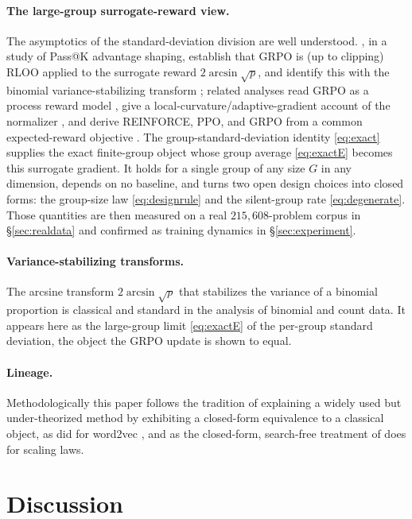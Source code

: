 \documentclass[11pt]{article}
\theoremstyle{plain}
\theoremstyle{definition}
\begin{document}
\paragraph{The large-group surrogate-reward view.} The asymptotics of the standard-deviation division are well understood. \citet{thrampoulidis2025advantageshaping}, in a study of Pass@K advantage shaping, establish that GRPO is (up to clipping) RLOO applied to the surrogate reward $2\arcsin\sqrt{p}$, and identify this with the binomial variance-stabilizing transform \citep{bartlett1936,anscombe1948}; related analyses read GRPO as a process reward model \citep{grpoprm2025}, give a local-curvature/adaptive-gradient account of the normalizer \citep{curvature2026}, and derive REINFORCE, PPO, and GRPO from a common expected-reward objective \citep{firstprinciples2026}. The group-standard-deviation identity \eqref{eq:exact} supplies the exact finite-group object whose group average \eqref{eq:exactE} becomes this surrogate gradient. It holds for a single group of any size $G$ in any dimension, depends on no baseline, and turns two open design choices into closed forms: the group-size law \eqref{eq:designrule} and the silent-group rate \eqref{eq:degenerate}. Those quantities are then measured on a real $215{,}608$-problem corpus in \S\ref{sec:realdata} and confirmed as training dynamics in \S\ref{sec:experiment}.

\paragraph{Variance-stabilizing transforms.} The arcsine transform $2\arcsin\sqrt p$ that stabilizes the variance of a binomial proportion is classical \citep{bartlett1936,anscombe1948} and standard in the analysis of binomial and count data. It appears here as the large-group limit \eqref{eq:exactE} of the per-group standard deviation, the object the GRPO update is shown to equal.

\paragraph{Lineage.} Methodologically this paper follows the tradition of explaining a widely used but under-theorized method by exhibiting a closed-form equivalence to a classical object, as \citet{levy2014implicit} did for word2vec \citep{mikolov2013word2vec}, and as the closed-form, search-free treatment of \citet{bay2026kore} does for scaling laws.

\section{Discussion}
\end{document}
